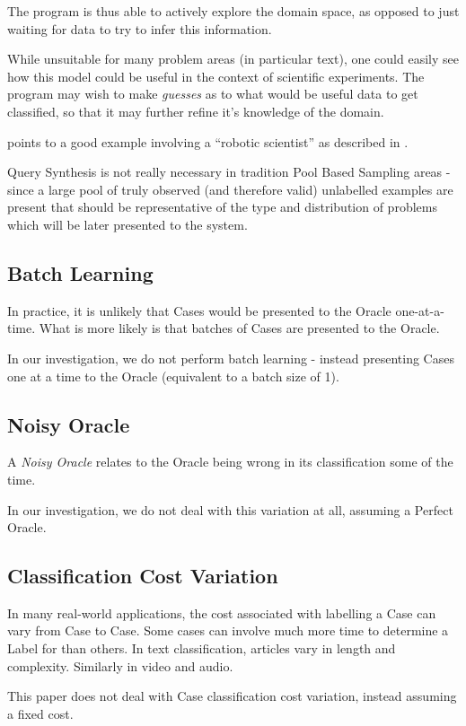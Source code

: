 \documentclass[a4paper,11pt]{report}
\begin{document}
The program is thus able to actively explore the domain space, as opposed to just waiting for data to try to infer this information.

While unsuitable for many problem areas (in particular text), one could easily see how this model could be useful in the context of scientific experiments. The program may wish to make \emph{guesses} as to what would be useful data to get classified, so that it may further refine it's knowledge of the domain.

\citet{Settles2010} points to a good example involving a ``robotic scientist'' as described in \citet{King2009}.

Query Synthesis is not really necessary in tradition Pool Based Sampling areas - since a large pool of truly observed (and therefore valid) unlabelled examples are present that should be representative of the type and distribution of problems which will be later presented to the system.

\subsection{Batch Learning}
In practice, it is unlikely that Cases would be presented to the Oracle one-at-a-time. What is more likely is that batches of Cases are presented to the Oracle.

In our investigation, we do not perform batch learning - instead presenting Cases one at a time to the Oracle (equivalent to a batch size of 1).

\subsection{Noisy Oracle}
A \emph{Noisy Oracle} relates to the Oracle being wrong in its classification some of the time.

In our investigation, we do not deal with this variation at all, assuming a Perfect Oracle.

\subsection{Classification Cost Variation}
In many real-world applications, the cost associated with labelling a Case can vary from Case to Case. Some cases can involve much more time to determine a Label for than others. In text classification, articles vary in length and complexity. Similarly in video and audio.

This paper does not deal with Case classification cost variation, instead assuming a fixed cost.
\end{document}
